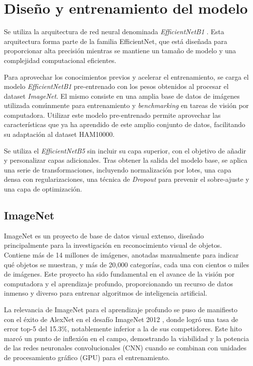 \section{Diseño y entrenamiento del modelo}

Se utiliza la arquitectura de red neural denominada \textit{EfficientNetB1} . Esta arquitectura forma parte de la familia EfficientNet, que está diseñada para proporcionar alta precisión mientras se mantiene un tamaño de modelo y una complejidad computacional eficientes.

Para aprovechar los conocimientos previos y acelerar el entrenamiento, se carga el modelo \textit{EfficientNetB1} pre-entrenado con los pesos obtenidos al procesar el dataset \textit{ImageNet}. El mismo consiste en una amplia base de datos de imágenes utilizada comúnmente para entrenamiento y \textit{benchmarking} en tareas de visión por computadora. Utilizar este modelo pre-entrenado permite aprovechar las características que ya ha aprendido de este amplio conjunto de datos, facilitando su adaptación al dataset HAM10000.

Se utiliza el \textit{EfficientNetB5} sin incluir su capa superior, con el objetivo de añadir y personalizar capas adicionales. Tras obtener la salida del modelo base, se aplica una serie de transformaciones, incluyendo normalización por lotes, una capa densa con regularizaciones, una técnica de \textit{Dropout} para prevenir el sobre-ajuste y una capa de optimización. 

\subsection{ImageNet}

ImageNet es un proyecto de base de datos visual extenso, diseñado principalmente para la investigación en reconocimiento visual de objetos. Contiene más de 14 millones de imágenes, anotadas manualmente para indicar qué objetos se muestran, y más de 20,000 categorías, cada una con cientos o miles de imágenes. Este proyecto ha sido fundamental en el avance de la visión por computadora y el aprendizaje profundo, proporcionando un recurso de datos inmenso y diverso para entrenar algoritmos de inteligencia artificial.

La relevancia de ImageNet para el aprendizaje profundo se puso de manifiesto con el éxito de AlexNet en el desafío ImageNet 2012 , donde logró una tasa de error top-5 del 15.3\%, notablemente inferior a la de sus competidores. Este hito marcó un punto de inflexión en el campo, demostrando la viabilidad y la potencia de las redes neuronales convolucionales (CNN) cuando se combinan con unidades de procesamiento gráfico (GPU) para el entrenamiento.

